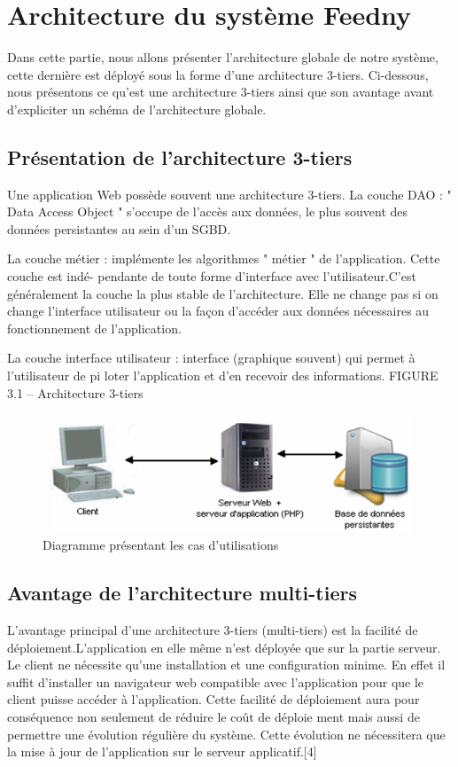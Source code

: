 
\section{Architecture du système \textquotedbl Feedny\textquotedbl}
Dans cette partie, nous allons présenter l'architecture globale de notre système, cette dernière est déployé sous la forme d'une architecture 3-tiers. Ci-dessous, nous présentons ce qu'est une architecture 3-tiers ainsi que son avantage avant d'expliciter un schéma de l'architecture globale.

\subsection{Présentation de l’architecture 3-tiers}
Une application Web possède souvent une architecture 3-tiers.
La couche DAO : " Data Access Object " s’occupe de l’accès aux données, le plus souvent des
données persistantes au sein d’un SGBD.

La couche métier : implémente les algorithmes " métier " de l’application. Cette couche est indé-
pendante de toute forme d’interface avec l’utilisateur.C’est généralement la couche la plus
stable de l’architecture. Elle ne change pas si on change l’interface utilisateur ou la façon
d’accéder aux données nécessaires au fonctionnement de l’application.

La couche interface utilisateur : interface (graphique souvent) qui permet à l’utilisateur de pi
loter l’application et d’en recevoir des informations.
FIGURE 3.1 – Architecture 3-tiers

\begin{figure}[H]
    \centering
    \includegraphics[height=100pt,width=400pt]{img/chapter3/tiers.png}
    \caption{Diagramme présentant les cas d'utilisations}
\end{figure}

\subsection{Avantage de l’architecture multi-tiers}
L’avantage principal d’une architecture 3-tiers (multi-tiers) est la facilité de déploiement.L’application
en elle même n’est déployée que sur la partie serveur.
Le client ne nécessite qu’une installation et une configuration minime.
En effet il suffit d’installer un navigateur web compatible avec l’application pour que le client
puisse accéder à l’application.
Cette facilité de déploiement aura pour conséquence non seulement de réduire le coût de déploie
ment mais aussi de permettre une évolution régulière du système. Cette évolution ne nécessitera
que la mise à jour de l’application sur le serveur applicatif.[4]

